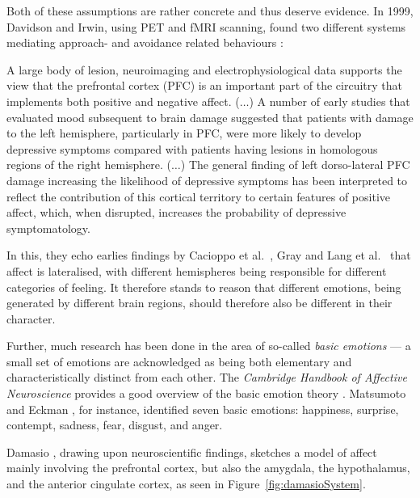 Both of these assumptions are rather concrete and thus deserve evidence. In 1999, Davidson and Irwin, using PET and fMRI scanning, found two different systems mediating approach- and avoidance related behaviours \cite[p.\ 13]{davidson1999}:

\begin{emquote}
A large body of lesion, neuroimaging and electrophysiological data supports the view that the prefrontal cortex (PFC) is an important part of the circuitry that implements both positive and negative affect. ($\dots$)
A number of early studies that evaluated mood subsequent to brain damage suggested that patients with damage to the left hemisphere, particularly in PFC, were more likely to develop depressive symptoms compared with patients having lesions in homologous regions of the right hemisphere. ($\dots$)
The general finding of left dorso-lateral PFC damage increasing the likelihood of depressive symptoms has been interpreted to reflect the contribution of this cortical territory to certain features of positive affect, which, when disrupted, increases the probability of depressive symptomatology.
\end{emquote}

In this, they echo earlies findings by Cacioppo et al.\ \cite{cacioppo1999}, Gray \cite{gray1994} and Lang et al.\ \cite{lang1990} that affect is lateralised, with different hemispheres being responsible for different categories of feeling. It therefore stands to reason that different emotions, being generated by different brain regions, should therefore also be different in their character.

Further, much research has been done in the area of so-called {\em basic emotions} --- a small set of emotions are acknowledged as being both elementary and characteristically distinct from each other. The \emph{Cambridge Handbook of Affective Neuroscience} provides a good overview of the basic emotion theory \cite[pp.\ 9-10]{cambridgeAff}. Matsumoto and Eckman \cite{matsumoto2009}, for instance, identified seven basic emotions: happiness, surprise, contempt, sadness, fear, disgust, and anger.

Damasio \cite{damasio1998}, drawing upon neuroscientific findings, sketches a model of affect mainly involving the prefrontal cortex, but also the amygdala, the hypothalamus, and the anterior cingulate cortex, as seen in Figure~\ref{fig:damasioSystem}.

